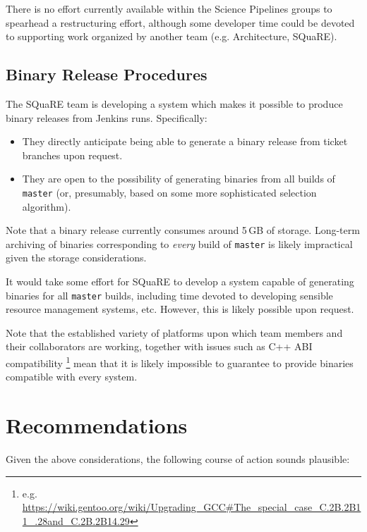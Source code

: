 \documentclass[DM,toc]{lsstdoc}
\begin{document}
There is no effort currently available within the Science Pipelines groups to
spearhead a restructuring effort, although some developer time could be
devoted to supporting work organized by another team (e.g. Architecture,
SQuaRE).

\subsection{Binary Release Procedures}
\label{sec:binaryrelease}

The SQuaRE team is developing a system which makes it possible to produce
binary releases from Jenkins runs. Specifically:

\begin{itemize}

  \item{They directly anticipate being able to generate a binary release from
  ticket branches upon request.}

  \item{They are open to the possibility of generating binaries from all
  builds of \texttt{master} (or, presumably, based on some more sophisticated
  selection algorithm).}

\end{itemize}

Note that a binary release currently consumes around 5\,GB of storage.
Long-term archiving of binaries corresponding to \textit{every} build of
\texttt{master} is likely impractical given the storage considerations.

It would take some effort for SQuaRE to develop a system capable of generating
binaries for all \texttt{master} builds, including time devoted to developing
sensible resource management systems, etc. However, this is likely possible
upon request.

Note that the established variety of platforms upon which team members and
their collaborators are working, together with issues such as C++ ABI
compatibility \footnote{e.g.
\url{https://wiki.gentoo.org/wiki/Upgrading\_GCC\#The\_special\_case\_C.2B.2B11\_.28and\_C.2B.2B14.29}}
mean that it is likely impossible to guarantee to provide binaries compatible
with every system.

\section{Recommendations}
\label{sec:recommendations}

Given the above considerations, the following course of action sounds
plausible:
\end{document}
